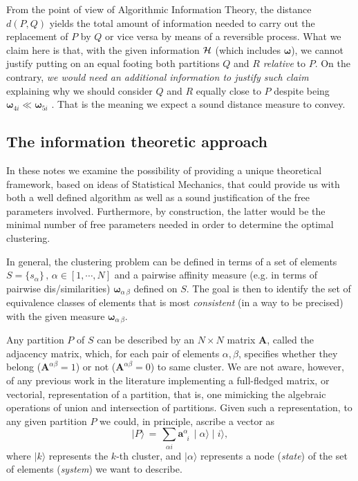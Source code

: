 \documentclass[twocolumn,aps,sort,nofootinbib]{revtex4}
\begin{document}
From the point of view of Algorithmic Information Theory\cite{Zurek89-1}, the 
distance \(d(P,Q)\) yields the total amount of information needed to carry 
out the replacement of \(P\) by \(Q\) or vice versa by means of a reversible process. What we claim here is 
that, with the given information \({\cal  H}\) (which includes \(\boldsymbol{\omega}\)), 
we cannot justify putting on an equal footing both partitions \(Q\) and \(R\) 
{\em relative} to \(P\). On the contrary, {\sl we would need an additional information 
to justify such claim} explaining why 
we should consider \(Q\) and \(R\) equally close to \(P\) 
despite being
$\boldsymbol\omega_{4i}\ll\boldsymbol\omega_{5i}$
. That is the meaning we expect a sound distance measure to convey.

\subsection{The information theoretic approach}\label{InformationTheoreticApproach}
In these notes we examine the possibility of providing a unique
theoretical framework, based on ideas of Statistical Mechanics, that
could provide us with both a well defined algorithm as well as
a sound justification of the free parameters involved. Furthermore,
by construction, the latter would be the minimal number of free
parameters needed in order to determine the optimal clustering.

In general, the clustering problem can be defined in
terms of a set of elements 
$S=\{s_\alpha\}\,,\,\alpha \in \left[1,\dotsi,N\right]$ 
and
a pairwise affinity measure (e.g. in terms of pairwise dis/similarities) 
$\boldsymbol{\omega}_{\alpha\,\beta}$ 
defined on $S$. The goal
is then to identify the set of equivalence classes of elements that
is most \textit{consistent} (in a way to be precised) with the
given measure $\boldsymbol{\omega}_{\alpha\,\beta}$.

  
Any partition $P$ of $S$ can be described by an $N\times N$ matrix $\mathbf{A}$,
called the adjacency matrix, which, for each pair of elements $\alpha , \beta$,
specifies whether they belong 
($\mathbf{A}^{\alpha\beta}=1$) 
or not 
($\mathbf{A}^{\alpha\beta}=0$) 
to same cluster. We are not aware, however, of any previous work in the literature
implementing a full-fledged matrix, or vectorial, representation of a partition, that is, one 
mimicking the algebraic operations of union and intersection of partitions.
Given such a representation, to any given partition $P$ we could, in principle, 
ascribe a vector as
\begin{equation}
\mid P\rangle\,=\,\sum_{\alpha i}\mathbf{a}^\alpha_{\phantom{a}i}\,\mid\alpha\rangle\mid i\rangle,
\label{PartitionKet0}
\end{equation}
where $\mid k \rangle$ represents the $k$-th cluster,
and $\mid\alpha\rangle$ represents a node ({\sl state}) of the
set of elements ({\sl system}) we want to describe.
\end{document}

